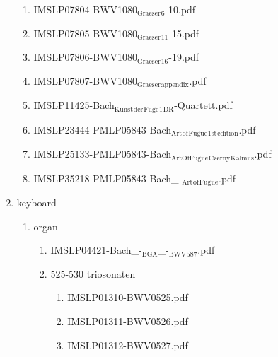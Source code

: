 \documentclass[11pt]{article}
\begin{document}
\begin{enumerate}
\begin{enumerate}
\item IMSLP07804-BWV1080$_{\text{Graeser}}$$_{\text{6}}$-10.pdf
\label{sec-1-1-1-1-44-6-3-9}

\item IMSLP07805-BWV1080$_{\text{Graeser}}$$_{\text{11}}$-15.pdf
\label{sec-1-1-1-1-44-6-3-10}

\item IMSLP07806-BWV1080$_{\text{Graeser}}$$_{\text{16}}$-19.pdf
\label{sec-1-1-1-1-44-6-3-11}

\item IMSLP07807-BWV1080$_{\text{Graeser}}$$_{\text{appendix}}$.pdf
\label{sec-1-1-1-1-44-6-3-12}

\item IMSLP11425-Bach$_{\text{Kunst}}$$_{\text{der}}$$_{\text{Fuge}}$$_{\text{1}}$$_{\text{DR}}$-Quartett.pdf
\label{sec-1-1-1-1-44-6-3-13}

\item IMSLP23444-PMLP05843-Bach$_{\text{Art}}$$_{\text{of}}$$_{\text{Fugue}}$$_{\text{1st}}$$_{\text{edition}}$.pdf
\label{sec-1-1-1-1-44-6-3-14}

\item IMSLP25133-PMLP05843-Bach$_{\text{ArtOfFugue}}$$_{\text{Czerny}}$$_{\text{Kalmus}}$.pdf
\label{sec-1-1-1-1-44-6-3-15}

\item IMSLP35218-PMLP05843-Bach\_-$_{\text{Art}}$$_{\text{of}}$$_{\text{Fugue}}$.pdf
\label{sec-1-1-1-1-44-6-3-16}
\end{enumerate}

\item keyboard
\label{sec-1-1-1-1-44-6-4}
\begin{enumerate}
\item organ
\label{sec-1-1-1-1-44-6-4-1}
\begin{enumerate}
\item IMSLP04421-Bach\_-$_{\text{BGA}}$\_-$_{\text{BWV}}$$_{\text{587}}$.pdf
\label{sec-1-1-1-1-44-6-4-1-1}

\item 525-530 triosonaten
\label{sec-1-1-1-1-44-6-4-1-2}
\begin{enumerate}
\item IMSLP01310-BWV0525.pdf
\label{sec-1-1-1-1-44-6-4-1-2-1}

\item IMSLP01311-BWV0526.pdf
\label{sec-1-1-1-1-44-6-4-1-2-2}

\item IMSLP01312-BWV0527.pdf
\label{sec-1-1-1-1-44-6-4-1-2-3}


\end{enumerate}
\end{enumerate}
\end{enumerate}
\end{enumerate}
\end{document}
